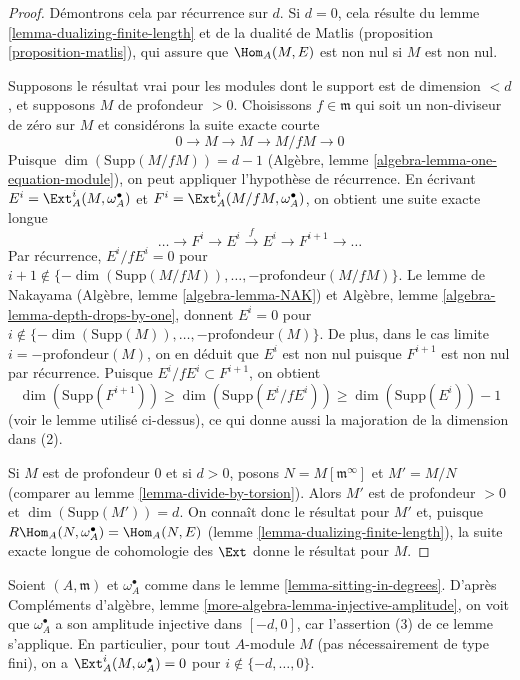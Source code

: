 \begin{proof}
Démontrons cela par récurrence sur $d$.
Si $d = 0$, cela résulte du lemme \ref{lemma-dualizing-finite-length} et de la dualité de Matlis
(proposition \ref{proposition-matlis}), qui assure que $\Hom_A(M, E)$ est non nul si $M$ est non nul.

\medskip\noindent
Supposons le résultat vrai pour les modules dont le support est de dimension
$< d$, et supposons $M$ de profondeur $> 0$.
Choisissons $f \in \mathfrak m$ qui soit un non-diviseur de zéro sur $M$
et considérons la suite exacte courte
$$
0 \to M \to M \to M/fM \to 0
$$
Puisque $\dim(\text{Supp}(M/fM)) = d - 1$ (Algèbre, lemme \ref{algebra-lemma-one-equation-module}), on peut appliquer l'hypothèse de récurrence.
En écrivant $E^i = \Ext^i_A(M, \omega_A^\bullet)$ et $F^i = \Ext^i_A(M/fM, \omega_A^\bullet)$, on obtient une suite exacte longue
$$
\ldots \to F^i \to E^i \xrightarrow{f} E^i \to F^{i + 1} \to \ldots
$$
Par récurrence, $E^i/fE^i = 0$ pour $i + 1 \not \in \{-\dim(\text{Supp}(M/fM)), \ldots, -\text{profondeur}(M/fM)\}$.
Le lemme de Nakayama (Algèbre, lemme \ref{algebra-lemma-NAK})
et Algèbre, lemme \ref{algebra-lemma-depth-drops-by-one}, donnent $E^i = 0$ pour $i \not \in \{-\dim(\text{Supp}(M)), \ldots, -\text{profondeur}(M)\}$.
De plus, dans le cas limite $i = - \text{profondeur}(M)$, on en déduit que $E^i$
est non nul puisque $F^{i + 1}$ est non nul par récurrence.
Puisque $E^i/fE^i \subset F^{i + 1}$, on obtient
$$
\dim(\text{Supp}(F^{i + 1})) \geq \dim(\text{Supp}(E^i/fE^i))
\geq \dim(\text{Supp}(E^i)) - 1
$$
(voir le lemme utilisé ci-dessus), ce qui donne aussi la majoration
de la dimension dans (2).

\medskip\noindent
Si $M$ est de profondeur $0$ et si $d > 0$,
posons $N = M[\mathfrak m^\infty]$ et $M' = M/N$ (comparer au lemme \ref{lemma-divide-by-torsion}).
Alors $M'$ est de profondeur $> 0$ et $\dim(\text{Supp}(M')) = d$.
On connaît donc le résultat pour $M'$ et, puisque
$R\Hom_A(N, \omega_A^\bullet) = \Hom_A(N, E)$
(lemme \ref{lemma-dualizing-finite-length}), la suite exacte longue de cohomologie des $\Ext$
donne le résultat pour $M$.
\end{proof}

\begin{remark}
\label{remark-vanishing-for-arbitrary-modules}
Soient $(A, \mathfrak m)$ et $\omega_A^\bullet$ comme dans le lemme \ref{lemma-sitting-in-degrees}.
D'après Compléments d'algèbre, lemme \ref{more-algebra-lemma-injective-amplitude},
on voit que $\omega_A^\bullet$ a son amplitude injective dans $[-d, 0]$,
car l'assertion (3) de ce lemme s'applique.
En particulier, pour tout $A$-module $M$ (pas nécessairement de type fini),
on a $\Ext^i_A(M, \omega_A^\bullet) = 0$ pour $i \not \in \{-d, \ldots, 0\}$.
\end{remark}

